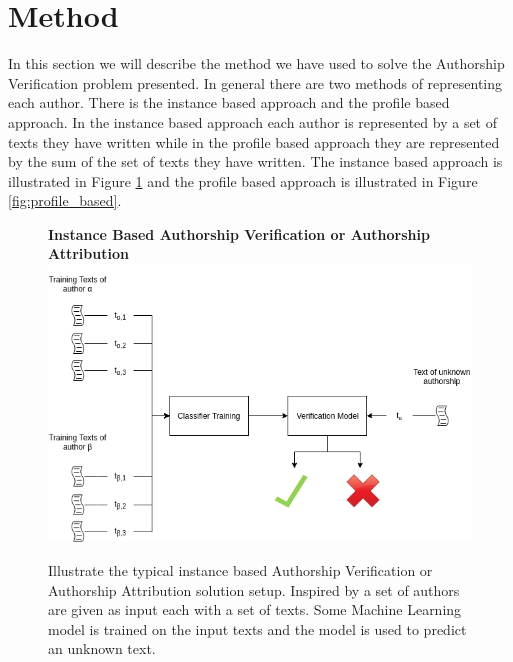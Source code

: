 \section{Method} \label{sec:method} 

In this section we will describe the method we have used to solve the Authorship
Verification problem presented. In general there are two methods of representing
each author. There is the instance based approach and the profile based
approach. In the instance based approach each author is represented by a set of
texts they have written while in the profile based approach they are represented
by the sum of the set of texts they have written. The instance based approach is
illustrated in Figure \ref{fig:instance_based} and the profile based approach is
illustrated in Figure \ref{fig:profile_based}.

\begin{figure}[htb]
    \centering
    \textbf{Instance Based Authorship Verification or Authorship Attribution}
    \includegraphics[scale=0.5]{./pictures/method/InstanceBased.png}

    \caption{Illustrate the typical instance based Authorship Verification or
    Authorship Attribution solution setup. Inspired by \cite{stamatos2009} a
    set of authors are given as input each with a set of texts. Some Machine
    Learning model is trained on the input texts and the model is used to
    predict an unknown text. }

    \label{fig:instance_based}
\end{figure}

